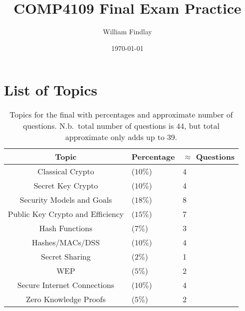 \documentclass[12pt]{article}
\title{COMP4109 Final Exam Practice}
\author{William Findlay}
\date{\today}
\begin{document}
\maketitle

\pagestyle{fancy}
\setlength{\headheight}{15pt}
\renewcommand{\maketitle}{\oldmaketitle}

\oldmaketitle
\thispagestyle{empty}

\newpage
{}
\tableofcontents

\newpage
\listoffigures
\newpage
\listoftables
\newpage
\lstlistoflistings

\newpage
{}
\setcounter{page}{1}

\hypertarget{list-of-topics}{%
\section{List of Topics}\label{list-of-topics}}

\begin{table}
\caption[Topics for the final]{Topics for the final with percentages and approximate number of questions.\newline
N.b.\ total number of questions is 44, but total approximate only adds up to 39.}
\begin{tabular}{|c|l|l|}
\hline
\textbf{Topic} & \textbf{Percentage} & \textbf{$\approx$ Questions}\\
\hline
\hline
Classical Crypto & ($10\%$) & 4\\
\hline
Secret Key Crypto & ($10\%$) & 4\\
\hline
Security Models and Goals & ($18\%$) & 8\\
\hline
Public Key Crypto and Efficiency & ($15\%$) &7\\
\hline
Hash Functions & ($7\%$) &3\\
\hline
Hashes/MACs/DSS & ($10\%$) &4\\
\hline
Secret Sharing & ($2\%$) &1\\
\hline
WEP & ($5\%$) &2\\
\hline
Secure Internet Connections & ($10\%$) &4\\
\hline
Zero Knowledge Proofs & ($5\%$) &2\\
\hline
\end{tabular}
\end{table}
\end{document}

